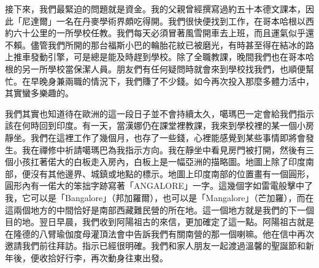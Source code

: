 接下來，我們最緊迫的問題就是資金。我的父親曾經撰寫過約五十本德文課本，因此「尼達爾」一名在丹麥學術界頗吃得開。我們很快便找到工作，在哥本哈根以西約六十公里的一所學校任教。我們每天必須冒著風雪開車去上班，而且運氣似乎還不賴。儘管我們所開的那台福斯小巴的輪胎花紋已被磨光，有時甚至得在結冰的路上推車發動引擎，可是總是能及時趕到學校。除了全職教課，晚間我們也在哥本哈根的另一所學校當保潔人員。朋友們有任何疑問時就會來到學校找我們，也順便幫忙。在早晚身兼兩職的情況下，我們賺了不少錢。如今再次投入那麼多體力活中，其實蠻多樂趣的。

我們其實也知道待在歐洲的這一段日子並不會持續太久，噶瑪巴一定會給我們指示該在何時回到印度。有一天，當漢娜仍在課堂裡教課，我來到學校裡的某一個小房靜坐。我們在這裡工作了幾個月，也存了一些錢，心裡能感覺到某些事情即將會發生。我在禪修中祈請噶瑪巴為我指示方向。我在靜坐中看見房門被打開，然後有三個小孩扛著偌大的白板走入房內，白板上是一幅亞洲的描略圖。地圖上除了印度南部，便沒有其他邊界、城鎮或地點的標示。地圖上印度南部的位置畫有一個圓形，圓形內有一偌大的笨拙字跡寫著「ANGALORE」一字。這幾個字如雷電般擊中了我，它可以是「Bangalore」（邦加羅爾），也可以是「Mangalore」（芒加羅），而在這兩個地方的中間恰好是南部西藏難民營的所在地。這一個地方就是我們的下一個目的地。翌日早晨，我們收到阿陽祖古的來信，更加確定了這一點。阿陽祖古就是在隆德的八臂瑜伽度母灌頂法會中告訴我們有關南營的那一個喇嘛。他在信中再次邀請我們前往拜訪。指示已經很明確。我們和家人朋友一起渡過溫馨的聖誕節和新年後，便收拾好行李，再次動身往東出發。
